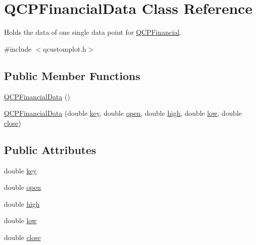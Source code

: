 \hypertarget{classQCPFinancialData}{}\section{Q\+C\+P\+Financial\+Data Class Reference}
\label{classQCPFinancialData}


Holds the data of one single data point for \hyperlink{classQCPFinancial}{Q\+C\+P\+Financial}.  




{\ttfamily \#include $<$qcustomplot.\+h$>$}

\subsection*{Public Member Functions}
\begin{DoxyCompactItemize}
\item 
\hyperlink{classQCPFinancialData_a1ca53b3a9ae4e9658a4fd1ca57d76ba4}{Q\+C\+P\+Financial\+Data} ()
\item 
\hyperlink{classQCPFinancialData_a069b72c514dfd4fc8e1d5df811e54ca4}{Q\+C\+P\+Financial\+Data} (double \hyperlink{classQCPFinancialData_a18bc92126f28c214b05b0161e5f5958b}{key}, double \hyperlink{classQCPFinancialData_a3059e1e1fbcb9fd243fde0450f238032}{open}, double \hyperlink{classQCPFinancialData_a299a4b241296fb6cd1baf5ab03f7126a}{high}, double \hyperlink{classQCPFinancialData_aecce0fb45a115e3f3a25eea78491ac16}{low}, double \hyperlink{classQCPFinancialData_a45e9b96944c4a08ea6c82a72d3d22df2}{close})
\end{DoxyCompactItemize}
\subsection*{Public Attributes}
\begin{DoxyCompactItemize}
\item 
double \hyperlink{classQCPFinancialData_a18bc92126f28c214b05b0161e5f5958b}{key}
\item 
double \hyperlink{classQCPFinancialData_a3059e1e1fbcb9fd243fde0450f238032}{open}
\item 
double \hyperlink{classQCPFinancialData_a299a4b241296fb6cd1baf5ab03f7126a}{high}
\item 
double \hyperlink{classQCPFinancialData_aecce0fb45a115e3f3a25eea78491ac16}{low}
\item 
double \hyperlink{classQCPFinancialData_a45e9b96944c4a08ea6c82a72d3d22df2}{close}
\end{DoxyCompactItemize}


